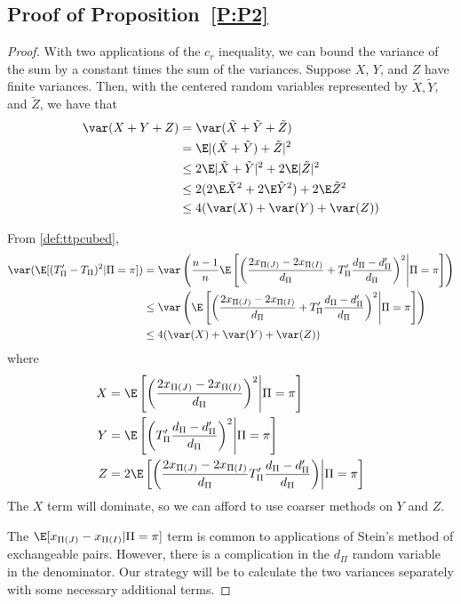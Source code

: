 \subsection{Proof of Proposition~\ref{P:P2}}
\begin{proof}
  With two applications of the $c_r$ inequality, we can bound the variance of the sum by a constant
times the sum of the variances.  Suppose $X$, $Y$, and $Z$ have finite variances.  Then, with the
centered random variables represented by $\tilde{X}, \tilde{Y}$, and $\tilde{Z}$, we have that
  \begin{align*}
    \var(X + Y + Z)
    &= \var(\tilde{X}+\tilde{Y}+\tilde{Z}) \\
    &= \E|(\tilde{X}+\tilde{Y})+\tilde{Z}|^2 \\
    &\leq 2 \E |\tilde{X}+\tilde{Y}|^2 + 2\E |\tilde{Z}|^2 \\
    &\leq 2(2\E \tilde{X}^2 + 2\E \tilde{Y}^2) + 2\E \tilde{Z}^2 \\
    &\leq 4(\var(X) + \var(Y) + \var(Z))
  \end{align*}

  From \eqref{def:ttpcubed},
  \begin{align*}
    \var (\E[(T_{\Pi}'-T_{\Pi})^2 | \Pi = \pi]) &= \var \left ( \frac{n-1}{n}\E \left [
      \left ( \frac{2x_{\Pi(J)}-2x_{\Pi(I)}}{d_{\Pi}}+T_{\Pi}'\frac{d_{\Pi}-d_{\Pi}'}{d_{\Pi}} \right )^2
        \middle | \Pi = \pi \right ] \right ) \\
    &\leq \var \left ( \E \left [
      \left ( \frac{2x_{\Pi(J)}-2x_{\Pi(I)}}{d_{\Pi}}+T_{\Pi}'\frac{d_{\Pi}-d_{\Pi}'}{d_{\Pi}} \right )^2
        \middle | \Pi = \pi \right ] \right ) \\
    &\leq 4(\var(X) + \var(Y) + \var(Z))
  \end{align*}
  where
  \begin{align*}
    X &= \E \left [ \left ( \frac{2x_{\Pi(J)}-2x_{\Pi(I)}}{d_{\Pi}} \right )^2
        \middle | \Pi = \pi \right ] \\
    Y &= \E \left [ \left
          ( T_{\Pi}'\frac{d_{\Pi}-d_{\Pi}'}{d_{\Pi}} \right )^2 \middle | \Pi = \pi \right ] \\
    Z &= 2 \E \left [ \left ( \frac{2x_{\Pi(J)}-2x_{\Pi(I)}}{d_{\Pi}}
         T_{\Pi}'\frac{d_{\Pi}-d_{\Pi}'}{d_{\Pi}} \right ) \middle | \Pi = \pi \right ]
  \end{align*}
  The $X$ term will dominate, so we can afford to use coarser methods on $Y$ and $Z$.

  The $\E[x_{\Pi(J)}-x_{\Pi(I)} | \Pi = \pi]$ term is common to applications of Stein's method of
  exchangeable pairs.  However, there is a complication in the $d_{\Pi}$ random variable in the
  denominator.  Our strategy will be to calculate the two variances separately with some necessary
  additional terms.


\end{proof}
